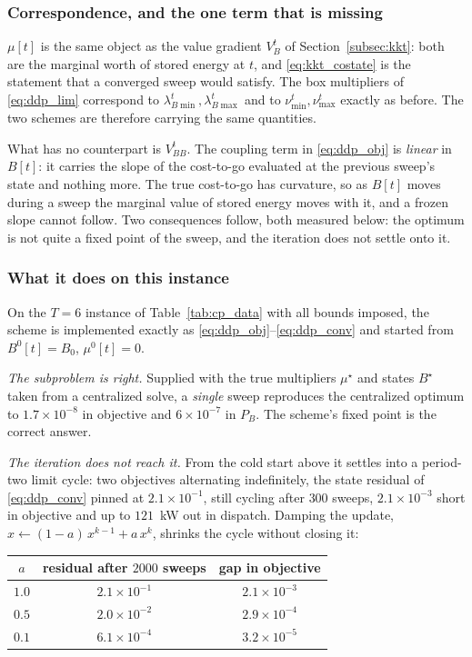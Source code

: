 \subsubsection{Correspondence, and the one term that is missing}
$\mu[t]$ is the same object as the value gradient $V_B^t$ of
Section~\ref{subsec:kkt}: both are the marginal worth of stored energy at $t$,
and \eqref{eq:kkt_costate} is the statement that a converged sweep would satisfy.
The box multipliers of \eqref{eq:ddp_lim} correspond to
$\lambda_{B\min}^t, \lambda_{B\max}^t$ and to $\nu_{\min}^t, \nu_{\max}^t$
exactly as before.  The two schemes are therefore carrying the same quantities.

What has no counterpart is $V_{BB}^t$.  The coupling term in
\eqref{eq:ddp_obj} is \emph{linear} in $B[t]$: it carries the slope of the
cost-to-go evaluated at the previous sweep's state and nothing more.  The true
cost-to-go has curvature, so as $B[t]$ moves during a sweep the marginal value of
stored energy moves with it, and a frozen slope cannot follow.  Two consequences
follow, both measured below: the optimum is not quite a fixed point of the
sweep, and the iteration does not settle onto it.

\subsubsection{What it does on this instance}
\label{subsec:ddp_results}
On the $T = 6$ instance of Table~\ref{tab:cp_data} with all bounds imposed,
the scheme is implemented exactly as
\eqref{eq:ddp_obj}--\eqref{eq:ddp_conv} and started from
$B^0[t] = B_0$, $\mu^0[t] = 0$.

\emph{The subproblem is right.}  Supplied with the true multipliers $\mu^\star$
and states $B^\star$ taken from a centralized solve, a \emph{single} sweep
reproduces the centralized optimum to $1.7\times10^{-8}$ in objective and
$6\times10^{-7}$ in $P_B$.  The scheme's fixed point is the correct answer.

\emph{The iteration does not reach it.}  From the cold start above it settles
into a period-two limit cycle: two objectives alternating indefinitely, the
state residual of \eqref{eq:ddp_conv} pinned at $2.1\times10^{-1}$, still
cycling after $300$ sweeps, $2.1\times10^{-3}$ short in objective and up to
$121$~kW out in dispatch.  Damping the update,
$x \leftarrow (1-a)\,x^{k-1} + a\,x^{k}$, shrinks the cycle without closing it:

\begin{center}
\footnotesize
\begin{tabular}{ccc}
\toprule
$a$ & residual after $2000$ sweeps & gap in objective \\
\midrule
$1.0$ & $2.1\times10^{-1}$ & $2.1\times10^{-3}$ \\
$0.5$ & $2.0\times10^{-2}$ & $2.9\times10^{-4}$ \\
$0.1$ & $6.1\times10^{-4}$ & $3.2\times10^{-5}$ \\
\bottomrule
\end{tabular}
\end{center}

